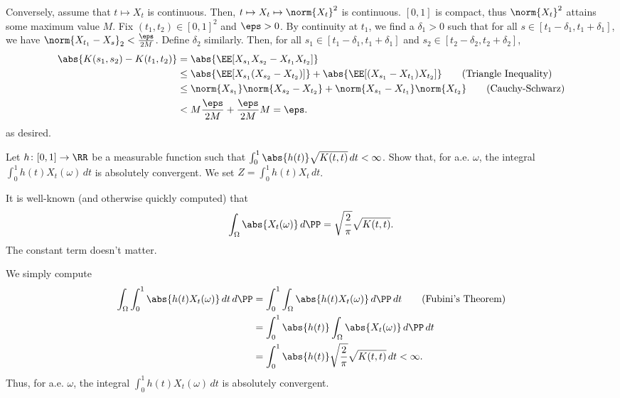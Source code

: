 \documentclass{scrartcl}
\begin{document}
Conversely, assume that $t \mapsto X_t$ is continuous. Then, $t\mapsto X_t \mapsto \norm{X_t}^2$ is continuous. $[0,1]$ is compact, thus $\norm{X_t}^2$ attains some maximum value $M$. Fix $(t_1,t_2) \in [0,1]^2$ and $\eps > 0$. By continuity at $t_1$, we find a $\delta_1 > 0$ such that for all $s \in [t_1 - \delta_1, t_1 + \delta_1]$, we have $\norm{X_{t_1} - X_s}_2 < \frac{\eps}{2M}$. Define $\delta_2$ similarly. Then, for all $s_1 \in [t_1 - \delta_1, t_1 + \delta_1]$ and $s_2 \in [t_2 - \delta_2, t_2 + \delta_2]$,
\begin{align*}
    \abs{K(s_1,s_2) - K(t_1,t_2)} &= \abs{\EE[X_{s_1} X_{s_2} - X_{t_1} X_{t_2}]}\\
    &\leq \abs{\EE[X_{s_1}(X_{s_2} - X_{t_2})]} + \abs{\EE[(X_{s_1} - X_{t_1})X_{t_2}]} \tag{Triangle Inequality}\\
    &\leq \norm{X_{s_1}}\norm{X_{s_2} - X_{t_2}} + \norm{X_{s_1} - X_{t_1}}\norm{X_{t_2}} \tag{Cauchy-Schwarz}\\
    &< M \frac{\eps}{2M} + \frac{\eps}{2M}M = \eps.
\end{align*}
as desired.

\begin{prob}
    Let $h \colon [0,1] \to \RR$ be a measurable function such that $\int_0^1 \abs{h(t)} \sqrt{K(t,t)} \, dt < \infty$. Show that, for a.e. $\omega$, the integral $\int_0^1 h(t)X_t(\omega) \, dt$ is absolutely convergent. We set $Z = \int_0^1 h(t)X_t \, dt$.
\end{prob}


It is well-known (and otherwise quickly computed) that
\[
    \int_\Omega \abs{X_t(\omega)} \, d\PP = \sqrt{\frac{2}{\pi}} \sqrt{K(t,t)}.  
\]
The constant term doesn't matter.

We simply compute
\begin{align*}
    \int_\Omega \int_0^1 \abs{h(t)X_t(\omega)} \, dt \, d\PP &= \int_0^1 \int_\Omega \abs{h(t)X_t(\omega)} \, d\PP \, dt \tag{Fubini's Theorem}\\
    &= \int_0^1 \abs{h(t)} \int_\Omega \abs{X_t(\omega)} \, d\PP \, dt\\
    &= \int_0^1 \abs{h(t)} \sqrt{\frac{2}{\pi}}\sqrt{K(t,t)} \, dt < \infty.
\end{align*}
Thus, for a.e. $\omega$, the integral $\int_0^1 h(t)X_t(\omega) \, dt$ is absolutely convergent.
\end{document}
